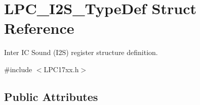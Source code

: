\hypertarget{struct_l_p_c___i2_s___type_def}{\section{\-L\-P\-C\-\_\-\-I2\-S\-\_\-\-Type\-Def \-Struct \-Reference}
\label{struct_l_p_c___i2_s___type_def}
}


\-Inter \-I\-C \-Sound (\-I2\-S) register structure definition.  




{\ttfamily \#include $<$\-L\-P\-C17xx.\-h$>$}

\subsection*{\-Public \-Attributes}
